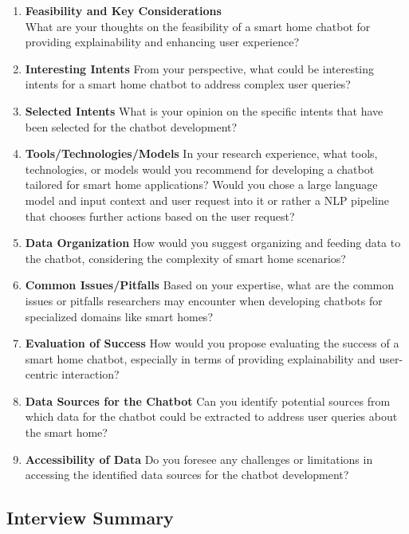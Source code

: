 \begin{enumerate}
    \item \textbf{Feasibility and Key Considerations} \\
    What are your thoughts on the feasibility of a smart home chatbot for providing explainability and enhancing user experience?
    \item \textbf{Interesting Intents}
    From your perspective, what could be interesting intents for a smart home chatbot to address complex user queries?    
    \item \textbf{Selected Intents}
    What is your opinion on the specific intents that have been selected for the chatbot development?    
    \item \textbf{Tools/Technologies/Models}
    In your research experience, what tools, technologies, or models would you recommend for developing a chatbot tailored for smart home applications?
    Would you chose a large language model and input context and user request into it or rather a NLP pipeline that chooses further actions based on the user request?   
    \item \textbf{Data Organization}
    How would you suggest organizing and feeding data to the chatbot, considering the complexity of smart home scenarios?    
    \item \textbf{Common Issues/Pitfalls}
    Based on your expertise, what are the common issues or pitfalls researchers may encounter when developing chatbots for specialized domains like smart homes?
    \item \textbf{Evaluation of Success}
    How would you propose evaluating the success of a smart home chatbot, especially in terms of providing explainability and user-centric interaction? 
    \item \textbf{Data Sources for the Chatbot}
    Can you identify potential sources from which data for the chatbot could be extracted to address user queries about the smart home?
    \item \textbf{Accessibility of Data}
    Do you foresee any challenges or limitations in accessing the identified data sources for the chatbot development?
           
\end{enumerate}

\subsection{Interview Summary}
\label{sec:interview_summary}

